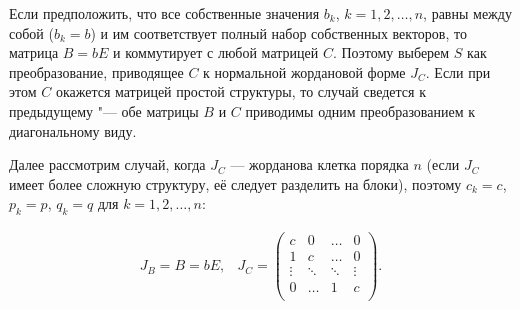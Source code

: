 





\smallskip




Если предположить, что все собственные значения $b_k$, $k={1, 2, \dots, n}$, равны между собой ($b_k=b$) и им соответствует полный набор собственных векторов, то матрица $B=bE$ и коммутирует с любой матрицей $C$. Поэтому выберем $S$ как преобразование, приводящее $C$ к нормальной жордановой форме $J_C$. Если при этом $C$ окажется матрицей простой структуры, то случай сведется к предыдущему "--- обе матрицы $B$ и $C$ приводимы одним преобразованием к диагональному виду.



Далее рассмотрим случай, когда $J_C$ --- жорданова клетка порядка $n$ (если $J_C$ имеет более сложную структуру, её следует разделить на блоки), поэтому $c_k=c$, $p_k=p$, $q_k=q$ для $k={1, 2, \dots, n}$:

\begin{equation*}

\begin{array}{cc}


J_B=B=bE,

&

J_C=\left(

    \begin{array}{cccc}

      c       & 0      & \ldots & 0 \\

      1       & c      & \ldots & 0 \\

      \vdots  & \ddots & \ddots & \vdots \\

      0       & \ldots & 1      & c \\

    \end{array}

\right).

\end{array}

\end{equation*}



